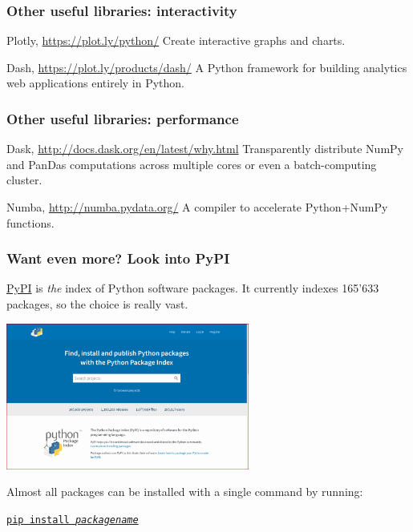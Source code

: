 \documentclass[english,serif,mathserif,xcolor=pdftex,dvipsnames,table]{beamer}
\begin{document}
\begin{frame}
  \frametitle{Other useful libraries: interactivity}

  \begin{describe}{Plotly, \url{https://plot.ly/python/}}
    Create interactive graphs and charts.
  \end{describe}

  \begin{describe}{Dash, \url{https://plot.ly/products/dash/}}
    A Python framework for building analytics web applications
    entirely in Python.
  \end{describe}

\end{frame}


\begin{frame}
  \frametitle{Other useful libraries: performance}

  \begin{describe}{Dask, \url{http://docs.dask.org/en/latest/why.html}}
    Transparently distribute NumPy and PanDas computations across
    multiple cores or even a batch-computing cluster.
  \end{describe}

  \begin{describe}{Numba, \url{http://numba.pydata.org/}}
    A compiler to accelerate Python+NumPy functions.
  \end{describe}

\end{frame}


\begin{frame}[fragile]
  \frametitle{Want even more? Look into PyPI}
  \small

  \href{http://pypi.python.org}{PyPI} is \emph{the} index of Python
  software packages.  It currently indexes 165'633 packages, so the
  choice is really vast.

  \begin{center}
    \includegraphics[width=0.60\textwidth]{fig/pypi_screenshot.png}
  \end{center}

  Almost all packages can be installed with a single command by
  running:
\begin{semiverbatim}
             \href{https://pypi.python.org/pypi/pip}{\texttt{pip install \emph{packagename}}}
\end{semiverbatim}

\end{frame}
\end{document}
